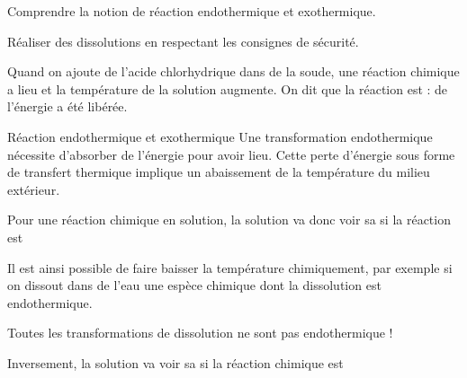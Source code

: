 \teteSndChim

\vspace*{-28pt}

\begin{objectifs}
  \item Comprendre la notion de réaction endothermique et exothermique.
  \item Réaliser des dissolutions en respectant les consignes de sécurité.
\end{objectifs}

\begin{contexte}
  Quand on ajoute de l'acide chlorhydrique dans de la soude, une réaction chimique a lieu et la température de la solution augmente.
  On dit que la réaction est  : de l'énergie a été libérée.
  
\end{contexte}


\begin{doc}{Réaction endothermique et exothermique}
  Une transformation endothermique nécessite d'absorber de l'énergie pour avoir lieu.
  Cette perte d'énergie sous forme de transfert thermique implique un abaissement de la température du milieu extérieur.
  
  \begin{importants}
    Pour une réaction chimique en solution, la solution va donc voir sa  si la réaction est 
  \end{importants}
  
  Il est ainsi possible de faire baisser la température chimiquement, par exemple si on dissout dans de l'eau une espèce chimique dont la dissolution est endothermique.
  
  \attention Toutes les transformations de dissolution ne sont pas endothermique !
  
  \begin{importants}
    Inversement, la solution va voir sa  si la réaction chimique est 
  \end{importants}
\end{doc}

